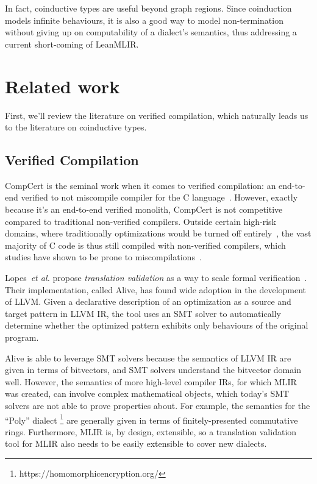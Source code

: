 \documentclass[a4paper]{scrartcl}
\newcommand*{\etal}{~\emph{et al.}}
\begin{document}
In fact, coinductive types are useful beyond graph regions. Since
coinduction models infinite behaviours, it is also a good way to model
non-termination without giving up on computability of a dialect's
semantics, thus addressing a current short-coming of LeanMLIR.



\section{Related work}\label{related-work}

First, we'll review the literature on verified compilation, which
naturally leads us to the literature on coinductive types.

\subsection{Verified Compilation}\label{verified-compilation}

CompCert is the
seminal work when it comes to verified compilation: an end-to-end
verified to not miscompile compiler for the C language~\cite{leroyCompCertFormallyVerified}.
However, exactly
because it's an end-to-end verified monolith, CompCert is not
competitive compared to traditional non-verified compilers. Outside
certain high-risk domains, where traditionally optimizations would be
turned off entirely~\cite{kastnerCompCertPracticalExperience},
the vast majority of C code is thus still compiled with non-verified
compilers, which studies have shown to be prone to miscompilations~\cite{yangFindingUnderstandingBugs2011}.

Lopes\etal{} propose \emph{translation validation} as a way to scale
formal verification~\cite{lopesAlive2BoundedTranslation2021}.
Their implementation, called Alive, has found wide adoption in the
development of LLVM. Given a declarative description of an optimization
as a source and target pattern in LLVM IR, the tool uses an SMT solver
to automatically determine whether the optimized pattern exhibits only
behaviours of the original program.

Alive is able to leverage SMT solvers because the semantics of LLVM IR
are given in terms of bitvectors, and SMT solvers understand the
bitvector domain well. However, the semantics of more high-level
compiler IRs, for which MLIR was created, can involve complex
mathematical objects, which today's SMT solvers are not able to prove
properties about. For example, the semantics for the ``Poly'' dialect
\footnote{https://homomorphicencryption.org/} are generally given in
terms of finitely-presented commutative rings. Furthermore, MLIR is, by
design, extensible, so a translation validation tool for MLIR also needs
to be easily extensible to cover new dialects.
\end{document}
